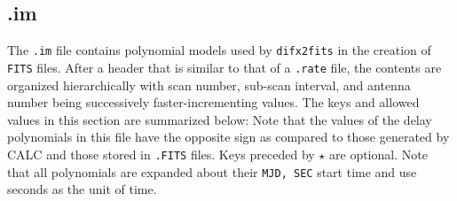 
\subsection{.im} \label{sec:im}

The {\tt .im} file contains polynomial models used by {\tt difx2fits} in the creation of {\tt FITS} files.
After a header that is similar to that of a {\tt .rate} file, the contents are organized hierarchically with scan number, sub-scan interval, and antenna number being successively faster-incrementing values.
The keys and allowed values in this section are summarized below:
Note that the values of the delay polynomials in this file have the opposite sign as compared to those generated by CALC and those stored in {\tt .FITS} files.
Keys preceded by $\star$ are optional.
Note that all polynomials are expanded about their {\tt MJD, SEC} start time and use seconds as the unit of time.

